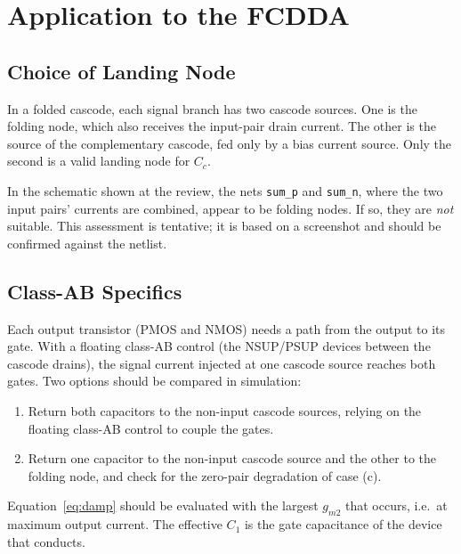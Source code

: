 \documentclass[journal]{IEEEtran}
\newcommand{\gmt}{g_{m2}}
\begin{document}
\section{Application to the FCDDA}
\subsection{Choice of Landing Node}
In a folded cascode, each signal branch has two cascode sources. One is the folding node, which also receives the input-pair drain current. The other is the source of the complementary cascode, fed only by a bias current source. Only the second is a valid landing node for $C_c$.

In the schematic shown at the review, the nets \texttt{sum\_p} and \texttt{sum\_n}, where the two input pairs' currents are combined, appear to be folding nodes. If so, they are \emph{not} suitable. This assessment is tentative; it is based on a screenshot and should be confirmed against the netlist.

\subsection{Class-AB Specifics}
Each output transistor (PMOS and NMOS) needs a path from the output to its gate. With a floating class-AB control (the NSUP/PSUP devices between the cascode drains), the signal current injected at one cascode source reaches both gates. Two options should be compared in simulation:
\begin{enumerate}
\item Return both capacitors to the non-input cascode sources, relying on the floating class-AB control to couple the gates.
\item Return one capacitor to the non-input cascode source and the other to the folding node, and check for the zero-pair degradation of case (c).
\end{enumerate}
Equation~\eqref{eq:damp} should be evaluated with the largest $\gmt$ that occurs, i.e.\ at maximum output current. The effective $C_1$ is the gate capacitance of the device that conducts.
\end{document}
